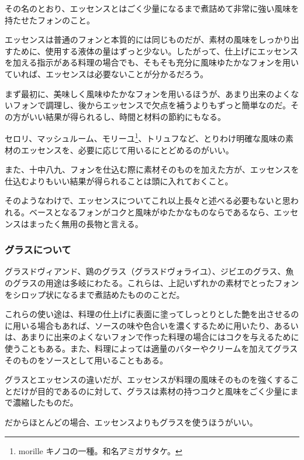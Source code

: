 \begin{recette}
その名のとおり、エッセンスとはごく少量になるまで煮詰めて非常に強い風味を持たせたフォンのこと。

エッセンスは普通のフォンと本質的には同じものだが、素材の風味をしっかり出すために、使用する液体の量はずっと少ない。したがって、仕上げにエッセンスを加える指示がある料理の場合でも、そもそも充分に風味ゆたかなフォンを用いていれば、エッセンスは必要ないことが分かるだろう。

まず最初に、美味しく風味ゆたかなフォンを用いるほうが、あまり出来のよくないフォンで調理し、後からエッセンスで欠点を補うよりもずっと簡単なのだ。その方がいい結果が得られるし、時間と材料の節約にもなる。

セロリ、マッシュルーム、モリーユ\footnote{morille
  キノコの一種。和名アミガサタケ。}、トリュフなど、とりわけ明確な風味の素材のエッセンスを、必要に応じて用いるにとどめるのがいい。

また、十中八九、フォンを仕込む際に素材そのものを加えた方が、エッセンスを仕込むよりもいい結果が得られることは頭に入れておくこと。

そのようなわけで、エッセンスについてこれ以上長々と述べる必要もないと思われる。ベースとなるフォンがコクと風味がゆたかなものならであるなら、エッセンスはまったく無用の長物と言える。

\hypertarget{glaces-diverses}{%
\subsubsection{グラスについて}\label{glaces-diverses}}



グラスドヴィアンド、鶏のグラス（グラスドヴォライユ）、ジビエのグラス、魚のグラスの用途は多岐にわたる。これらは、上記いずれかの素材でとったフォンをシロップ状になるまで煮詰めたもののことだ。

これらの使い途は、料理の仕上げに表面に塗ってしっとりとした艶を出させるのに用いる場合もあれば、ソースの味や色合いを濃くするために用いたり、あるいは、あまりに出来のよくないフォンで作った料理の場合にはコクを与えるために使うこともある。また、料理によっては適量のバターやクリームを加えてグラスそのものをソースとして用いることもある。

グラスとエッセンスの違いだが、エッセンスが料理の風味そのものを強くすることだけが目的であるのに対して、グラスは素材の持つコクと風味をごく少量にまで濃縮したものだ。

だからほとんどの場合、エッセンスよりもグラスを使うほうがいい。


\end{recette}
